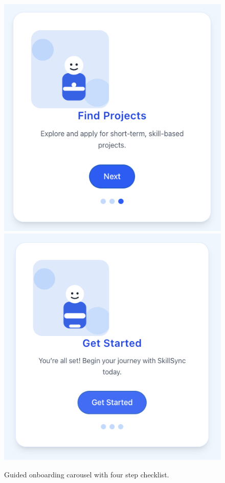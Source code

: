 \begin{figure}[H]
\begin{minipage}[b]{0.45\textwidth}
  \end{minipage}\hfill
  \begin{minipage}[b]{0.45\textwidth}
    \centering
    \includegraphics[width=\linewidth]{figures/Onboarding-3.png}\\[0.3em]
    \includegraphics[width=\linewidth]{figures/Onboarding-4.png}
  \end{minipage}
  \caption{Guided onboarding carousel with four step checklist.}
  \label{fig:onboarding-flow}
\end{figure}

